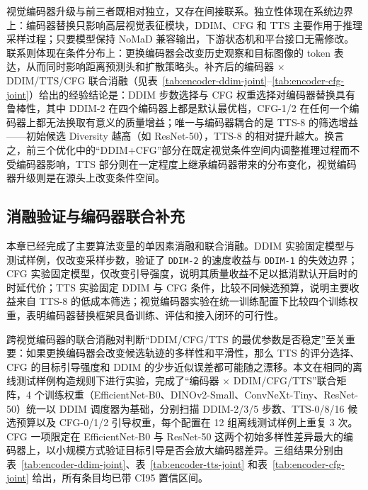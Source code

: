 视觉编码器升级与前三者既相对独立，又存在间接联系。独立性体现在系统边界上：编码器替换只影响高层视觉表征模块，DDIM、CFG 和 TTS 主要作用于推理采样过程；只要模型保持 NoMaD 兼容输出，下游状态机和平台接口无需修改。联系则体现在条件分布上：更换编码器会改变历史观察和目标图像的 token 表达，从而同时影响距离预测头和扩散策略头。补齐后的编码器 $\times$ DDIM/TTS/CFG 联合消融（见表~\ref{tab:encoder-ddim-joint}--\ref{tab:encoder-cfg-joint}）给出的经验结论是：DDIM 步数选择与 CFG 权重选择对编码器替换具有鲁棒性，其中 DDIM-2 在四个编码器上都是默认最优档，CFG-1/2 在任何一个编码器上都无法换取有意义的质量增益；唯一与编码器耦合的是 TTS-8 的筛选增益——初始候选 Diversity 越高（如 ResNet-50），TTS-8 的相对提升越大。换言之，前三个优化中的``DDIM+CFG''部分在既定视觉条件空间内调整推理过程而不受编码器影响，TTS 部分则在一定程度上继承编码器带来的分布变化，视觉编码器升级则是在源头上改变条件空间。

\subsection{消融验证与编码器联合补充}

本章已经完成了主要算法变量的单因素消融和联合消融。DDIM 实验固定模型与测试样例，仅改变采样步数，验证了 \texttt{DDIM-2} 的速度收益与 \texttt{DDIM-1} 的失效边界；CFG 实验固定模型，仅改变引导强度，说明其质量收益不足以抵消默认开启时的时延代价；TTS 实验固定 DDIM 与 CFG 条件，比较不同候选预算，说明主要收益来自 TTS-8 的低成本筛选；视觉编码器实验在统一训练配置下比较四个训练权重，表明编码器替换框架具备训练、评估和接入闭环的可行性。

跨视觉编码器的联合消融对判断``DDIM/CFG/TTS 的最优参数是否稳定''至关重要：如果更换编码器会改变候选轨迹的多样性和平滑性，那么 TTS 的评分选择、CFG 的目标引导强度和 DDIM 的少步近似误差都可能随之漂移。本文在相同的离线测试样例构造规则下进行实验，完成了``编码器 $\times$ DDIM/CFG/TTS''联合矩阵，4 个训练权重（EfficientNet-B0、DINOv2-Small、ConvNeXt-Tiny、ResNet-50）统一以 DDIM 调度器为基础，分别扫描 DDIM-2/3/5 步数、TTS-0/8/16 候选预算以及 CFG-0/1/2 引导权重，每个配置在 12 组离线测试样例上重复 3 次。CFG 一项限定在 EfficientNet-B0 与 ResNet-50 这两个初始多样性差异最大的编码器上，以小规模方式验证目标引导是否会放大编码器差异。三组结果分别由表~\ref{tab:encoder-ddim-joint}、表~\ref{tab:encoder-tts-joint} 和表~\ref{tab:encoder-cfg-joint} 给出，所有条目均已带 CI95 置信区间。

